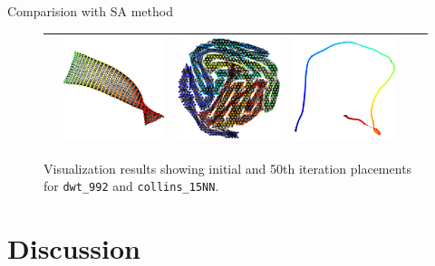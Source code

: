 \documentclass[dvipdfmx,13pt,aspectratio=169]{beamer}
\begin{document}
\begin{frame}{Comparision with SA method}
\begin{figure}[t]
\begin{tabular}{cccccc}
         & \includegraphics[width=0.15\columnwidth]{../main/circle/vis/dwt_992_CN-L-BFGS_50_last.png}
         & \includegraphics[width=0.15\columnwidth]{../main/circle/vis/collins_15NN_CN-L-BFGS_50_first.png}
         & \includegraphics[width=0.15\columnwidth]{../main/circle/vis/collins_15NN_CN-L-BFGS_50_last.png}                                                          \\
        \bottomrule
      \end{tabular}
      \caption{\small{Visualization results showing initial and 50th iteration placements for \texttt{dwt\_992} and \texttt{collins\_15NN}.}}
      \label{fig:CN_vs_SA}
    \end{figure}
  \end{frame}
\fi

\section{Discussion}
\end{document}

